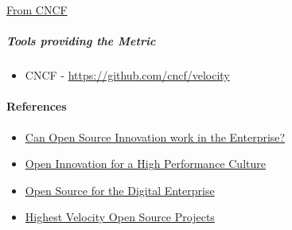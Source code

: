 \href{https://www.cncf.io/blog/2017/06/05/30-highest-velocity-open-source-projects/}{From
CNCF}

\hypertarget{tools-providing-the-metric}{%
\subparagraph{Tools providing the
Metric}\label{tools-providing-the-metric}}

\begin{itemize}
\tightlist
\item
  CNCF - \url{https://github.com/cncf/velocity}
\end{itemize}

\hypertarget{references}{%
\paragraph{References}\label{references}}

\begin{itemize}
\tightlist
\item
  \href{https://www.threefivetwo.com/blog/can-open-source-innovation-work-in-the-enterprise}{Can
  Open Source Innovation work in the Enterprise?}
\item
  \href{https://www.nearform.com/blog/want-a-high-performing-culture-make-way-for-open-innovation}{Open
  Innovation for a High Performance Culture}
\item
  \href{https://www.cio.com/article/3213146/open-source-is-powering-the-digital-enterprise.html}{Open
  Source for the Digital Enterprise}
\item
  \href{https://www.cncf.io/blog/2017/06/05/30-highest-velocity-open-source-projects}{Highest
  Velocity Open Source Projects}
\end{itemize}
